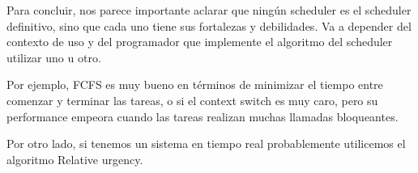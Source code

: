 
Para concluir, nos parece importante aclarar que ningún scheduler es el scheduler definitivo, sino que cada uno tiene sus fortalezas y debilidades. Va a depender del contexto de uso y del programador que implemente el algoritmo del scheduler utilizar uno u otro.

Por ejemplo, FCFS es muy bueno en términos de minimizar el tiempo entre comenzar y terminar las tareas, o si el context switch es muy caro, pero su performance empeora cuando las tareas realizan muchas llamadas bloqueantes.

Por otro lado, si tenemos un sistema en tiempo real probablemente utilicemos el algoritmo Relative urgency.